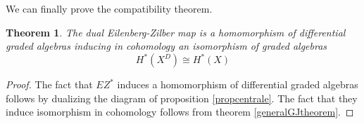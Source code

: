 \documentclass[a4paper,11pt]{article}
\newtheorem{theorem}{Theorem}[section]
\theoremstyle{remark}
\theoremstyle{definition}
\begin{document}


We can finally prove the compatibility theorem.
\begin{theorem}
The dual Eilenberg-Zilber map
is a homomorphism
of differential graded algebras inducing in cohomology
an isomorphism 
of graded algebras
	\begin{equation*}
	{H}^{*}(X^{D})\cong {H}^{*}(X) 
	\end{equation*}
\end{theorem}
\begin{proof}
The fact that $EZ^*$ induces a homomorphism of differential graded algebras follows by dualizing the diagram of proposition \ref{propcentrale}.  
The fact that they induce isomorphism in cohomology follows from theorem \ref{generalGJtheorem}.

\end{proof}






\end{document}
